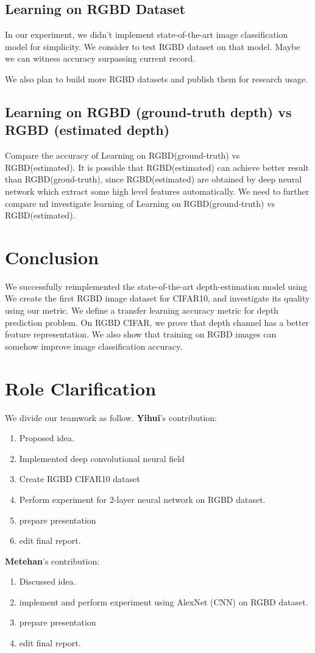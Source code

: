 \documentclass[10pt,twocolumn,letterpaper]{article}
\begin{document}
 
\subsection{Learning on RGBD Dataset}
In our experiment, we didn\rq{}t implement state-of-the-art image classification model\cite{he2015deep} for simplicity.
We consider to test RGBD dataset on that model. 
Maybe we can witness accuracy surpassing current record.

We also plan to build more RGBD datasets and publish them for research usage.

\subsection{Learning on RGBD (ground-truth depth) vs RGBD (estimated depth)}
Compare the accuracy of Learning on RGBD(ground-truth) vs RGBD(estimated). It is possible that RGBD(estimated) can achieve better result than RGBD(groud-truth), since RGBD(estimated) are obtained by deep neural network which extract some high level features automatically. We need to further compare nd investigate learning of Learning on RGBD(ground-truth) vs RGBD(estimated).

\section{Conclusion}
We successfully reimplemented the state-of-the-art depth-estimation model using
We create the first RGBD image dataset for CIFAR10, and investigate its quality 
using our metric.
We define a transfer learning accuracy metric for depth prediction problem.
On RGBD CIFAR, we prove that depth channel has a better feature representation.
We also show that training on RGBD images can somehow improve image 
classification accuracy.


\section*{Role Clarification}
We divide our teamwork as follow. {\bf Yihui}'s contribution:
\begin{enumerate}
\item Proposed idea.
\item Implemented deep convolutional neural field 
\item Create RGBD CIFAR10 dataset
\item Perform experiment for 2-layer neural network on RGBD dataset.
\item prepare presentation
\item edit final report.
\end{enumerate}
{\bf Metehan}'s contribution:
\begin{enumerate}
\item Discussed idea.
\item implement and perform experiment using AlexNet (CNN) on RGBD dataset. 
\item prepare presentation 
\item edit final report.
\end{enumerate}

{\small
\printbibliography
}
\end{document}
